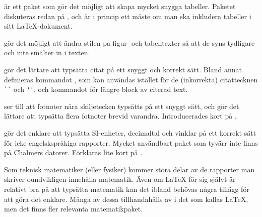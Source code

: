 \documentclass[lang=sv,ptsize=10pt,font=none,nomath,titles=bf,../../a4.tex]{subfiles}
\begin{document}
\begin{description}
	\item[\pack{booktabs}]
	är ett paket som gör det möjligt att skapa mycket snygga tabeller.
	Paketet diskuteras redan på , och är i princip
	ett måste om man ska inkludera tabeller i sitt \LaTeX-dokument.

	\item[\pack{caption}]
	gör det möjligt att ändra stilen på figur- och tabelltexter så att de
	syns tydligare och inte smälter in i texten.

	\item[\pack{csquotes}]
	gör det lättare att typsätta citat på ett snyggt och korrekt sätt.
	Bland annat definieras kommandot , som kan användas
	istället för de (inkorrekta) citattecknen \verb|``| och \verb|''|, 
	och kommandot  för längre block av citerad text.

	\item[\pack{fnpct}]
	ser till att fotnoter nära skiljetecken typsätts på ett snyggt sätt,
	och gör det lättare att typsätta flera fotnoter brevid varandra.
	Introducerades kort på .
	
	\item[{\pack{siunitx}}]
	gör det enklare att typsätta SI-enheter, decimaltal och vinklar på ett
	korrekt sätt för icke engelskspråkiga rapporter. Mycket användbart
	paket som tyvärr inte finns på Chalmers datorer. Förklaras lite kort
	på .
\end{description}

Som teknisk matematiker (eller fysiker) kommer stora delar av de rapporter
man skriver oundvikligen innehålla matematik. Även om \LaTeX{} för sig
självt är relativt bra på att typsätta matematik kan det ibland behövas
några tillägg för att göra det enklare. Många av dessa tillhandahålls av
\AmS{} i det som kallas \AmS\LaTeX, men det finns fler relevanta
matematikpaket.
\end{document}
